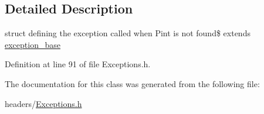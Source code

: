 \subsection{Detailed Description}
struct defining the exception called when Pint is not found\$ extends \hyperlink{structexception__base}{exception\+\_\+base} 

Definition at line 91 of file Exceptions.\+h.



The documentation for this class was generated from the following file\+:\begin{DoxyCompactItemize}
\item 
headers/\hyperlink{Exceptions_8h}{Exceptions.\+h}\end{DoxyCompactItemize}
